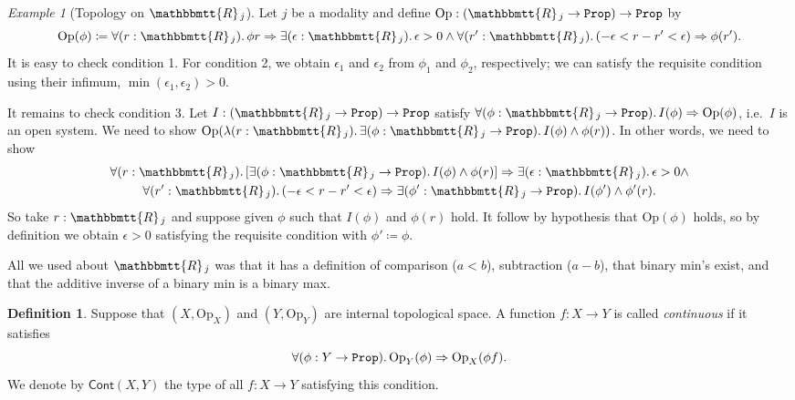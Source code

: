\documentclass[11pt, oneside, article]{memoir}
\theoremstyle{plain}
\theoremstyle{definition}
\newtheorem{definition}[theorem]{Definition}
\theoremstyle{remark}
\newtheorem{example}[theorem]{Example}
\newcommand{\const}[1]{\mathtt{#1}}
\newcommand{\Set}[1]{\mathrm{#1}}
\newcommand{\Fun}[1]{\mathsf{#1}}
\newcommand{\internal}[1]{\raisebox{-.03ex}{$\mathbbmtt{#1}$}}
\newcommand{\hs}{\hspace{1.1pt}}
\newcommand{\tRR}{\internal{R}\hs}
\newcommand{\Cont}{\Fun{Cont}}
\newcommand{\Prop}{\const{Prop}}
\newcommand{\Op}{\Set{Op}}
\newcommand{\imp}{\Rightarrow}
\begin{document}
\begin{example}[Topology on $\tRR_j$]\label{ex.usual_topology_R}
Let $j$ be a modality and define $\Op:(\tRR_j\to\Prop)\to\Prop$ by
\[\Op(\phi)\coloneqq\forall(r:\tRR_j)\ldotp\phi r\imp\exists(\epsilon:\tRR_j)\ldotp\epsilon>0\wedge\forall(r':\tRR_j)\ldotp(-\epsilon<r-r'<\epsilon)\imp\phi(r').\]
It is easy to check condition 1. For condition 2, we obtain $\epsilon_1$ and $\epsilon_2$ from $\phi_1$ and $\phi_2$, respectively; we can satisfy the requisite condition using their infimum, $\min(\epsilon_1,\epsilon_2)>0$.

It remains to check condition 3. Let $I:(\tRR_j\to\Prop)\to\Prop$ satisfy $\forall(\phi:\tRR_j\to\Prop)\ldotp I(\phi)\imp\Op(\phi)$, i.e.\ $I$ is an open system. We need to show $\Op(\lambda(r:\tRR_j)\ldotp\exists(\phi:\tRR_j\to\Prop)\ldotp I(\phi)\wedge\phi (r))$. In other words, we need to show
\begin{multline*}
  \forall(r:\tRR_j)\ldotp[\exists(\phi:\tRR_j\to\Prop)\ldotp I(\phi)\wedge\phi(r)]\imp\exists(\epsilon:\tRR_j)\ldotp\epsilon>0\wedge\\
  \forall(r':\tRR_j)\ldotp(-\epsilon<r-r'<\epsilon)\imp\exists(\phi':\tRR_j\to\Prop)\ldotp I(\phi')\wedge\phi'(r).
\end{multline*}
So take $r:\tRR_j$ and suppose given $\phi$ such that $I(\phi)$ and $\phi(r)$ hold. It follow by hypothesis that $\Op(\phi)$ holds, so by definition we obtain $\epsilon>0$ satisfying the requisite condition with $\phi'\coloneqq\phi$.

All we used about $\tRR_j$ was that it has a definition of comparison ($a<b$), subtraction ($a-b$), that binary min's exist, and that the additive inverse of a binary min is a binary max.
\end{example}

\begin{definition}\label{def.continuous}
Suppose that $(X,\Op_X)$ and $(Y,\Op_Y)$ are internal topological space. A function $f:X\to Y$ is called \emph{continuous} if it satisfies
\[\forall(\phi:Y\to\Prop)\ldotp\Op_Y(\phi)\imp\Op_X(\phi f).\]
We denote by $\Cont(X,Y)$ the type of all $f:X\to Y$ satisfying this condition.
\end{definition}
\end{document}
